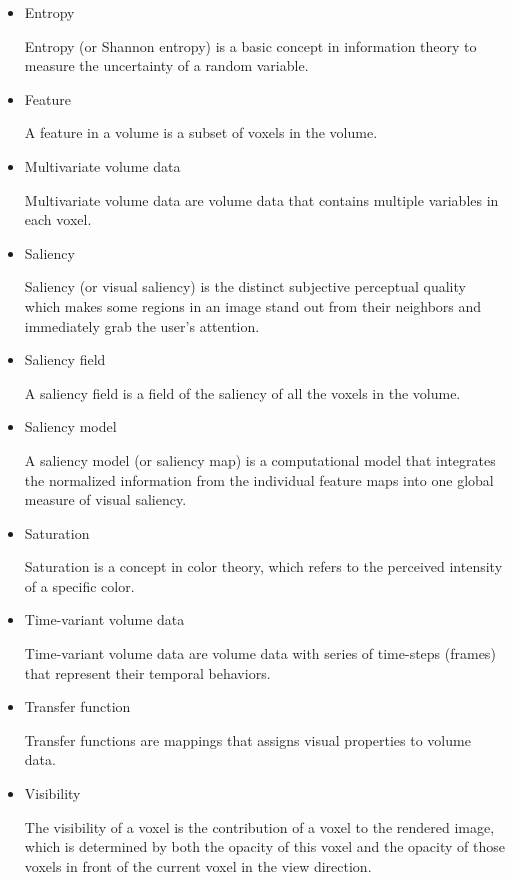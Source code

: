 \documentclass[a4paper, 12pt, twoside, openright]{report}         %
\begin{document}
\begin{itemize}
	
\item Entropy 
	
Entropy (or Shannon entropy) is a basic concept in information theory to measure the uncertainty of a random variable.
	
\item Feature

A feature in a volume is a subset of voxels in the volume.
	
\item Multivariate volume data

Multivariate volume data are volume data that contains multiple variables in each voxel.

\item Saliency

Saliency (or visual saliency) is the distinct subjective perceptual quality which makes some regions in an image stand out from their neighbors and immediately grab the user's attention.

\item Saliency field

A saliency field is a field of the saliency of all the voxels in the volume.
	
\item Saliency model

A saliency model (or saliency map) is a computational model that integrates the normalized information from the individual feature maps into one global measure of visual saliency.

\item Saturation

Saturation is a concept in color theory, which refers to the perceived intensity of a specific color.

\item Time-variant volume data

Time-variant volume data are volume data with series of time-steps (frames) that represent their temporal behaviors.

\item Transfer function

Transfer functions are mappings that assigns visual properties to volume data.

\item Visibility

The visibility of a voxel is the contribution of a voxel to the rendered image, which is determined by both the opacity of this voxel and the opacity of those voxels in front of the current voxel in the view direction.


\end{itemize}
\end{document}
